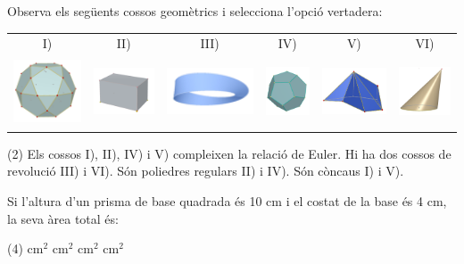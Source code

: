 \begin{autoaval}{55}
\begin{mylist}
\exer  Observa els següents cossos geomètrics i selecciona l'opció vertadera:
	\hspace{-0.25cm}
\begin{center}
	\begin{tabular}{cccccc}
		I) & II) & III) & IV) & V) & VI) \\
      \includegraphics[height=2cm]{img-11/image672} &
 \includegraphics[height=1.5cm]{img-11/image673} &
  \includegraphics[height=1.5cm]{img-11/image674} &
   \includegraphics[height=1.5cm]{img-11/image675} &
    \includegraphics[height=1.5cm]{img-11/image676} &
     \includegraphics[height=1.5cm]{img-11/image677}
    \end{tabular}
 \end{center}
 
     \begin{tasks}(2)
	\task*  Els cossos I), II), IV) i V) compleixen la relació de Euler.
	\task*  Hi ha dos cossos de revolució III) i VI).
	\task  Són poliedres regulars II) i IV).
	\task  Són còncaus I) i V).
\end{tasks}


\exer  Si l'altura d'un prisma de base quadrada és 10 cm i el costat de la base és 4 cm, la seva àrea total és:

\begin{tasks}(4)
	 cm${}^{2}$    
	 cm${}^{2}$   
	 cm${}^{2}$   
	 cm${}^{2}$
\end{tasks}



\end{mylist}
\end{autoaval}
